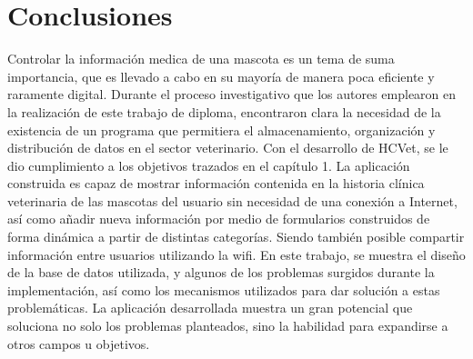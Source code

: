 \chapter*{Conclusiones}\label{chapter:conclusions}

Controlar la información medica de una mascota es un tema de suma importancia, que es llevado a cabo en su mayoría de manera poca eficiente y raramente digital. Durante el proceso investigativo que los autores emplearon en la realización de este trabajo de diploma, encontraron clara la necesidad de la existencia de un programa que permitiera el almacenamiento, organización y distribución de datos en el sector veterinario. Con el desarrollo de HCVet, se le dio cumplimiento a los objetivos trazados en el capítulo 1. La aplicación construida es capaz de mostrar información contenida en la historia clínica veterinaria de las mascotas del usuario sin necesidad de una conexión a Internet, así como añadir nueva información por medio de formularios construidos de forma dinámica a partir de distintas categorías. Siendo también posible compartir información entre usuarios utilizando la wifi. En este trabajo, se muestra el diseño de la base de datos utilizada, y algunos de los problemas surgidos durante la implementación, así como los mecanismos utilizados para dar solución a estas problemáticas. La aplicación desarrollada muestra un gran potencial que soluciona no solo los problemas planteados, sino la habilidad para expandirse a otros campos u objetivos. 